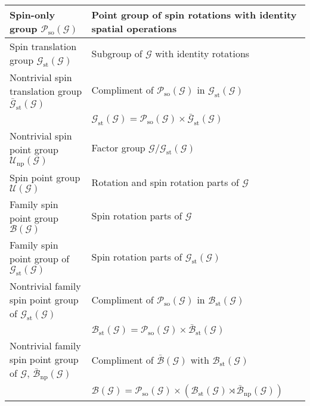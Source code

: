 \begin{table*}[tb]
\begin{tabular}{ll}
        \hline
        Spin-only group $\mathcal{P}_{\mathrm{so}}(\mathcal{G})$ & Point group of spin rotations with identity spatial operations \\
        \hline
        Spin translation group $\mathcal{G}_{\mathrm{st}}(\mathcal{G})$ & Subgroup of $\mathcal{G}$ with identity rotations \\
        Nontrivial spin translation group $\bar{\mathcal{G}}_{\mathrm{st}}(\mathcal{G})$
            & Compliment of $\mathcal{P}_{\mathrm{so}}(\mathcal{G})$ in $\mathcal{G}_{\mathrm{st}}(\mathcal{G})$ \\
            & $\mathcal{G}_{\mathrm{st}}(\mathcal{G}) = \mathcal{P}_{\mathrm{so}}(\mathcal{G}) \times \bar{\mathcal{G}}_{\mathrm{st}}(\mathcal{G})$ \\
        Nontrivial spin point group $\mathcal{U}_{\mathrm{np}}(\mathcal{G})$ & Factor group $\mathcal{G} / \mathcal{G}_{\mathrm{st}}(\mathcal{G})$ \\
        \hline
        Spin point group $\mathcal{U}(\mathcal{G})$ & Rotation and spin rotation parts of $\mathcal{G}$ \\
        Family spin point group $\mathcal{B}(\mathcal{G})$ & Spin rotation parts of $\mathcal{G}$ \\
        Family spin point group of $\mathcal{G}_{\mathrm{st}}(\mathcal{G})$ & Spin rotation parts of $\mathcal{G}_{\mathrm{st}}(\mathcal{G})$ \\
        Nontrivial family spin point group of $\mathcal{G}_{\mathrm{st}}(\mathcal{G})$
            & Compliment of $\mathcal{P}_{\mathrm{so}}(\mathcal{G})$ in $\mathcal{B}_{\mathrm{st}}(\mathcal{G})$ \\
            & $\mathcal{B}_{\mathrm{st}}(\mathcal{G}) = \mathcal{P}_{\mathrm{so}}(\mathcal{G}) \times \bar{\mathcal{B}}_{\mathrm{st}}(\mathcal{G})$ \\
        Nontrivial family spin point group of $\mathcal{G}$, $\bar{\mathcal{B}}_{\mathrm{np}}(\mathcal{G})$
            & Compliment of $\bar{\mathcal{B}}(\mathcal{G})$ with $\mathcal{B}_{\mathrm{st}}(\mathcal{G})$ \\
            & $\mathcal{B}(\mathcal{G}) = \mathcal{P}_{\mathrm{so}}(\mathcal{G}) \times \left( \mathcal{B}_{\mathrm{st}}(\mathcal{G}) \rtimes \bar{\mathcal{B}}_{\mathrm{np}}(\mathcal{G}) \right)$ \\
        \hline\hline
    \end{tabular}
\end{table*}
